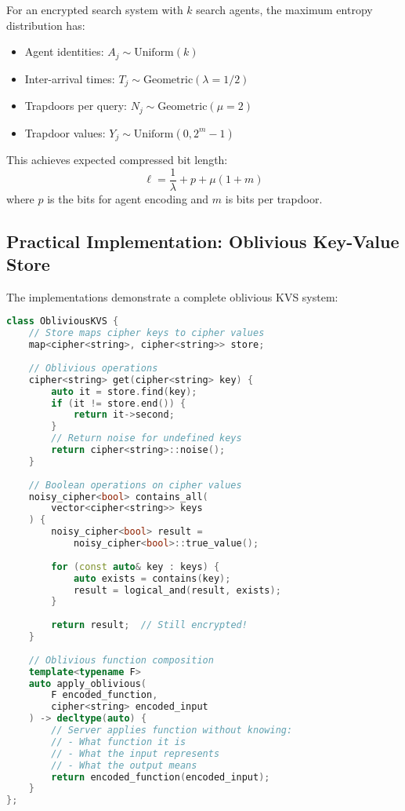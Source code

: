 \begin{theorem}
For an encrypted search system with $k$ search agents, the maximum entropy distribution has:
\begin{itemize}
\item Agent identities: $A_j \sim \text{Uniform}(k)$
\item Inter-arrival times: $T_j \sim \text{Geometric}(\lambda = 1/2)$
\item Trapdoors per query: $N_j \sim \text{Geometric}(\mu = 2)$
\item Trapdoor values: $Y_j \sim \text{Uniform}(0, 2^m - 1)$
\end{itemize}
This achieves expected compressed bit length:
\begin{equation}
\ell = \frac{1}{\lambda} + p + \mu(1 + m)
\end{equation}
where $p$ is the bits for agent encoding and $m$ is bits per trapdoor.
\end{theorem}

\subsection{Practical Implementation: Oblivious Key-Value Store}

The implementations demonstrate a complete oblivious KVS system:

\begin{lstlisting}[language=C++, caption={Complete oblivious KVS with cipher operations}]
class ObliviousKVS {
    // Store maps cipher keys to cipher values
    map<cipher<string>, cipher<string>> store;
    
    // Oblivious operations
    cipher<string> get(cipher<string> key) {
        auto it = store.find(key);
        if (it != store.end()) {
            return it->second;
        }
        // Return noise for undefined keys
        return cipher<string>::noise();
    }
    
    // Boolean operations on cipher values
    noisy_cipher<bool> contains_all(
        vector<cipher<string>> keys
    ) {
        noisy_cipher<bool> result = 
            noisy_cipher<bool>::true_value();
        
        for (const auto& key : keys) {
            auto exists = contains(key);
            result = logical_and(result, exists);
        }
        
        return result;  // Still encrypted!
    }
    
    // Oblivious function composition
    template<typename F>
    auto apply_oblivious(
        F encoded_function,
        cipher<string> encoded_input
    ) -> decltype(auto) {
        // Server applies function without knowing:
        // - What function it is
        // - What the input represents
        // - What the output means
        return encoded_function(encoded_input);
    }
};
\end{lstlisting}

